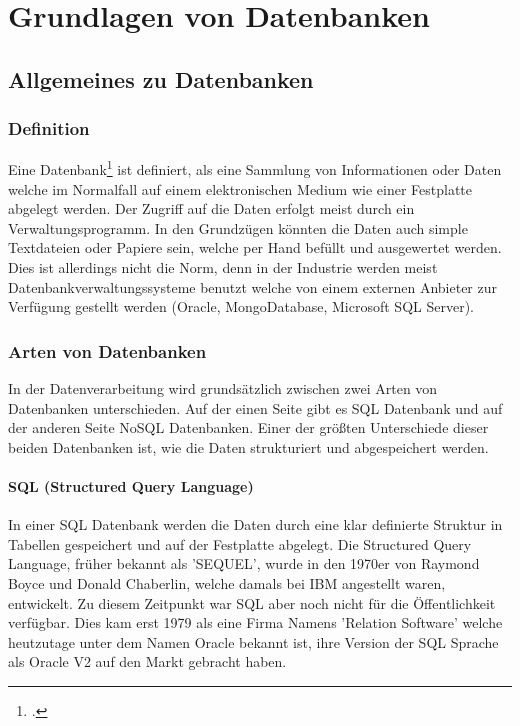 \chapter{Grundlagen von Datenbanken}
\bauer
\section{Allgemeines zu Datenbanken}
\subsection{Definition}
Eine Datenbank\footcite{oracle} ist definiert, als eine Sammlung von Informationen oder Daten welche im Normalfall auf einem elektronischen Medium wie einer Festplatte abgelegt werden. 
Der Zugriff auf die Daten erfolgt meist durch ein Verwaltungsprogramm. In den Grundzügen könnten die Daten auch simple Textdateien oder Papiere sein, welche per Hand befüllt und ausgewertet werden. 
Dies ist allerdings nicht die Norm, denn in der Industrie werden meist Datenbankverwaltungssysteme benutzt welche von einem externen Anbieter zur Verfügung gestellt werden (Oracle, MongoDatabase, Microsoft SQL Server).	
\subsection{Arten von Datenbanken}
In der Datenverarbeitung wird grundsätzlich zwischen zwei Arten von Datenbanken unterschieden. Auf der einen Seite gibt es SQL Datenbank und auf der anderen Seite NoSQL Datenbanken. 
Einer der größten Unterschiede dieser beiden Datenbanken ist, wie die Daten strukturiert und abgespeichert werden.
\subsubsection{SQL (Structured Query Language)} 
In einer SQL Datenbank werden die Daten durch eine klar definierte Struktur in Tabellen gespeichert und auf der Festplatte abgelegt. 
Die Structured Query Language, früher bekannt als 'SEQUEL', wurde in den 1970er von Raymond Boyce und Donald Chaberlin, welche damals bei IBM angestellt waren, entwickelt. 
Zu diesem Zeitpunkt war SQL aber noch nicht für die Öffentlichkeit verfügbar. Dies kam erst 1979 als eine Firma Namens 'Relation Software' welche heutzutage unter dem Namen Oracle bekannt ist, ihre Version der SQL Sprache als Oracle V2 auf den Markt gebracht haben.
